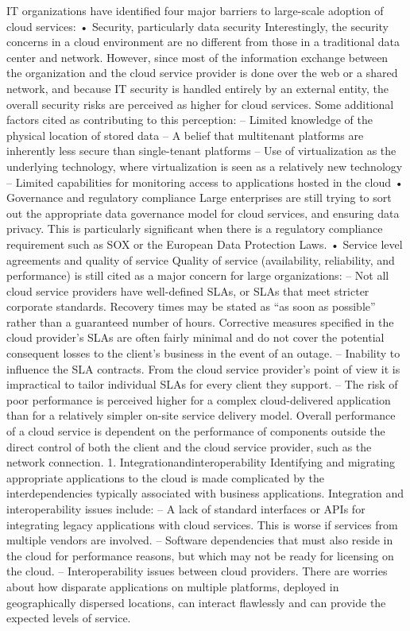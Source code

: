 IT organizations have identified four major barriers to large-scale adoption of cloud services:
•  Security, particularly data security
Interestingly, the security concerns in a cloud environment are no different from those in a traditional data center and network. However, since most of the information exchange between the organization and the cloud service provider is done over the web or a shared network, and because IT security is handled entirely by an external entity, the overall security risks are perceived as higher for cloud services.
Some additional factors cited as contributing to this perception:
– Limited knowledge of the physical location of stored data
– A belief that multitenant platforms are inherently less secure than single-tenant platforms
– Use of virtualization as the underlying technology, where virtualization is seen as a relatively new technology
– Limited capabilities for monitoring access to applications hosted in the cloud
•  Governance and regulatory compliance
Large enterprises are still trying to sort out the appropriate data governance model for cloud services, and ensuring data privacy. This is particularly significant when there is a regulatory compliance requirement such as SOX or the European Data Protection Laws.
•  Service level agreements and quality of service
Quality of service (availability, reliability, and performance) is still cited as a
major concern for large organizations:
– Not all cloud service providers have well-defined SLAs, or SLAs that meet stricter corporate standards. Recovery times may be stated as “as soon as possible” rather than a guaranteed number of hours. Corrective measures specified in the cloud provider's SLAs are often fairly minimal and do not cover the potential consequent losses to the client's business in the event of an outage.
– Inability to influence the SLA contracts. From the cloud service provider's point of view it is impractical to tailor individual SLAs for every client they support.
– The risk of poor performance is perceived higher for a complex cloud-delivered application than for a relatively simpler on-site service delivery model. Overall performance of a cloud service is dependent on the performance of components outside the direct control of both the client and the cloud service provider, such as the network connection.
1. Integrationandinteroperability
Identifying and migrating appropriate applications to the cloud is made complicated by the interdependencies typically associated with business applications. Integration and interoperability issues include:
– A lack of standard interfaces or APIs for integrating legacy applications with cloud services. This is worse if services from multiple vendors are involved.
– Software dependencies that must also reside in the cloud for performance reasons, but which may not be ready for licensing on the cloud.
– Interoperability issues between cloud providers. There are worries about how disparate applications on multiple platforms, deployed in geographically dispersed locations, can interact flawlessly and can provide the expected levels of service.